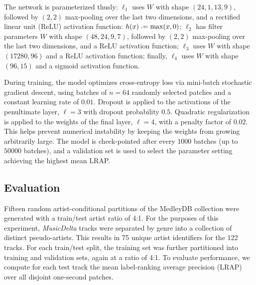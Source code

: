 \documentclass{article}
\begin{document}
The network is parameterized thusly:
$\ell_1$ uses $W$ with shape $(24, 1, 13, 9)$, followed by $(2, 2)$ max-pooling over the last two
dimensions, and a rectified linear unit (ReLU) activation function: $h(x) \defeq \max(x, 0)$;
$\ell_2$ has filter parameters $W$ with shape $(48, 24, 9, 7)$, followed by $(2, 2)$ max-pooling over the last two dimensions, and a ReLU activation function;
$\ell_3$ uses $W$ with shape $(17280, 96)$ and a ReLU activation function;
finally, $\ell_4$ uses $W$ with shape $(96, 15)$ and a sigmoid activation function.

During training, the model optimizes cross-entropy loss via mini-batch stochastic
gradient descent, using batches of $n=64$ randomly selected patches and a constant 
learning rate of $0.01$.
Dropout is applied to the activations of the penultimate layer, $\ell=3$ with dropout
probability $0.5$.
Quadratic regularization is applied to the weights of the final layer, $\ell=4$, with a
penalty factor of $0.02$. This helps prevent numerical instability by keeping
the weights from growing arbitrarily large.
The model is check-pointed after every $1000$ batches (up to $50000$ batches), and a 
validation set is used to select the parameter setting achieving the highest mean LRAP.\@

\subsection{Evaluation}

Fifteen random artist-conditional partitions of the MedleyDB collection were generated with
a train/test artist ratio of 4:1.  For the purposes of this experiment,
\emph{MusicDelta} tracks were separated by genre into a collection of distinct 
pseudo-artists. 
This results in 75 unique artist identifiers for the 122 tracks.
For each train/test split, the training set was further partitioned into
training and validation sets, again at a ratio of 4:1.
To evaluate performance, we compute for each test track the mean label-ranking average
precision (LRAP) over all disjoint one-second patches.
\end{document}
